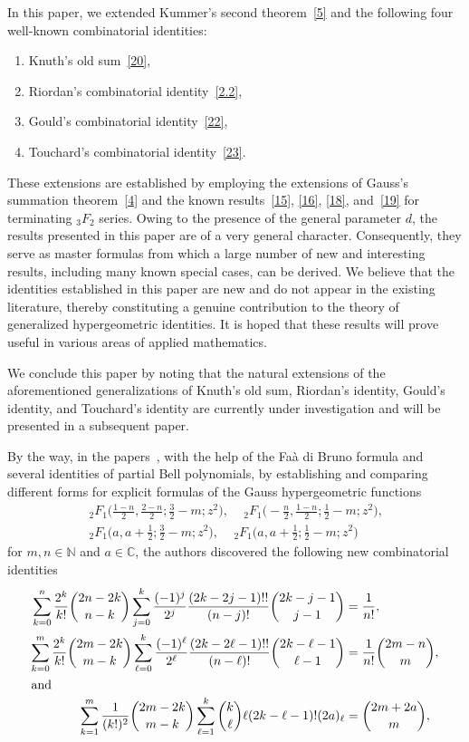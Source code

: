\documentclass[reqno]{amsart}
\numberwithin{equation}{section}
\theoremstyle{plain}
\theoremstyle{remark}
\begin{document}
In this paper, we extended Kummer's second theorem~\eqref{5} and the following four well-known combinatorial identities:
\begin{enumerate}
\item 
Knuth's old sum~\eqref{20},
\item 
Riordan's combinatorial identity~\eqref{2.2},
\item 
Gould's combinatorial identity~\eqref{22},
\item 
Touchard's combinatorial identity~\eqref{23}.
\end{enumerate}
These extensions are established by employing the extensions of Gauss's summation theorem~\eqref{4} and the known results~\eqref{15}, \eqref{16}, \eqref{18}, and~\eqref{19} for terminating ${}_3F_{2}$ series. Owing to the presence of the general parameter $d$, the results presented in this paper are of a very general character. Consequently, they serve as master formulas from which a large number of new and interesting results, including many known special cases, can be derived. We believe that the identities established in this paper are new and do not appear in the existing literature, thereby constituting a genuine contribution to the theory of generalized hypergeometric identities. It is hoped that these results will prove useful in various areas of applied mathematics.
\par
We conclude this paper by noting that the natural extensions of the aforementioned generalizations of Knuth's old sum, Riordan's identity, Gould's identity, and Touchard's identity are currently under investigation and will be presented in a subsequent paper.
\par
By the way, in the papers~\cite{Gauss-2Formula.tex, DA19034-cas-sc.tex}, with the help of the Fa\`a di Bruno formula and several identities of partial Bell polynomials, by establishing and comparing different forms for explicit formulas of the Gauss hypergeometric functions
\begin{gather*}
{\,}_2F_1\biggl(\frac{1-n}{2},\frac{2-n}{2};\frac{3}{2}-m;z^2\biggr), \quad
{\,}_2F_1\biggl(-\frac{n}{2},\frac{1-n}{2};\frac{1}{2}-m;z^2\biggr),\\
{\,}_2F_1\biggl(a,a+\frac{1}{2};\frac{3}{2}-m;z^2\biggr), \quad
{\,}_2F_1\biggl(a,a+\frac{1}{2};\frac{1}{2}-m;z^2\biggr)
\end{gather*}
for $m,n\in\mathbb{N}$ and $a\in\mathbb{C}$, the authors discovered the following new combinatorial identities
\begin{align*}
\sum_{k=0}^{n} \frac{2^{k}}{k!}\binom{2n-2k}{n-k}
\sum_{j=0}^{k}\frac{(-1)^{j}}{2^j}
\frac{(2k-2j-1)!!}{(n-j)!}
\binom{2k-j-1}{j-1}
&=\frac{1}{n!},\\
\sum_{k=0}^{m}\frac{2^k}{k!} \binom{2m-2k}{m-k}
\sum_{\ell=0}^{k} \frac{(-1)^\ell}{2^\ell}
\frac{(2k-2\ell-1)!!}{(n-\ell)!}
\binom{2k-\ell-1}{\ell-1}
&=\frac{1}{n!}\binom{2m-n}{m},\\
\intertext{and}
\sum_{k=1}^{m}\frac{1}{(k!)^2}\binom{2m-2k}{m-k}
\sum_{\ell=1}^{k} \binom{k}{\ell}\ell(2k-\ell-1)! (2a)_\ell
&=\binom{2m+2a}{m},
\end{align*}
\end{document}
